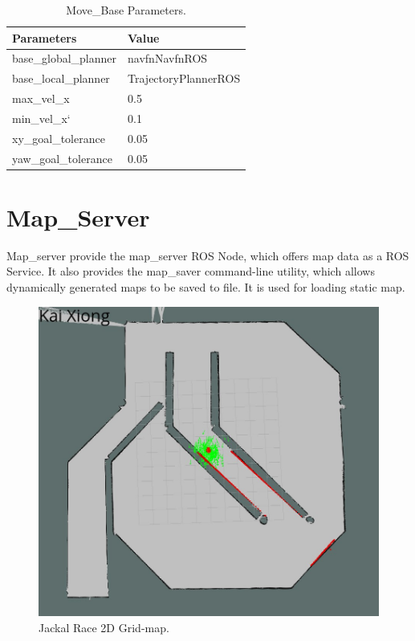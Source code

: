 \documentclass[10pt,journal,compsoc]{IEEEtran}
\begin{document}
\begin{table}[thpb]
\begin{tabular}{|l|l|}
\hline
\textbf{Parameters}   & \textbf{Value}       \\ \hline
base\_global\_planner & navfnNavfnROS        \\ \hline
base\_local\_planner  & TrajectoryPlannerROS \\ \hline
max\_vel\_x           & 0.5                  \\ \hline
min\_vel\_x`          & 0.1                  \\ \hline
xy\_goal\_tolerance   & 0.05                 \\ \hline
yaw\_goal\_tolerance  & 0.05                 \\ \hline
\end{tabular}
\caption{Move\_Base Parameters.}
\label{tab:template3}
\end{table}

\section{Map\_Server}
Map\_server provide the map\_server ROS Node, which offers map data as a ROS Service. It also provides the map\_saver command-line utility, which allows dynamically generated maps to be saved to file. It is used for loading static map.

\begin{figure}[thpb]
      \centering
      \includegraphics[scale=0.125]{map.jpg}
      \caption{Jackal Race 2D Grid-map.}
      \label{fig:robot2}
\end{figure}
\end{document}

